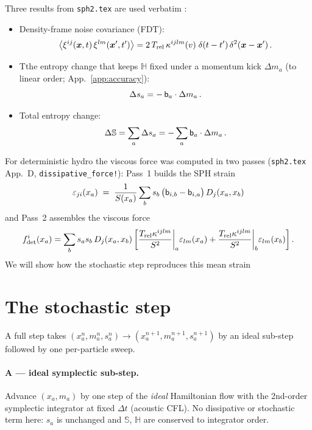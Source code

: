 \documentclass[12pt,aps,preprint,nofootinbib,noshowkeys,noshowpacs,longbibliography,superscriptaddress,tightenlines]{revtex4-2}
\def\Sbb{{\mathbb S}}
\def\bbeta{{\sf b}}
\def\x{{\bm x}}
\def\llangle{\left\langle}
\def\rrangle{\right\rangle}
\def\app#1{App.~\ref{#1}}
\def\st{\begin{equation}}
\def\stp{\end{equation}}
\begin{document}
Three results from \texttt{sph2.tex} are used verbatim :
\begin{itemize}
  \item Density-frame noise covariance (FDT):
        \st
        \label{eq:fdt}
        \llangle \xi^{ij}(\x,t)\,\xi^{lm}(\x',t')\rrangle
          = 2\,T_{\rm rel}\,\kappa^{ijlm}(v)\;\delta(t-t')\,\delta^2(\x-\x')\,.
        \stp
  \item Tthe entropy change that keeps $\mathbb H$ fixed
        under a momentum kick $\Delta m_a$ (to linear order;
        \app{app:accuracy}):
        \st
        \label{eq:ds}
        \Delta s_a = -\,\bbeta_a\cdot\Delta m_a\,.
        \stp
  \item Total entropy change:
        \st
        \label{eq:dS}
        \Delta\Sbb = \sum_a \Delta s_a = -\sum_a \bbeta_a\cdot\Delta m_a\,.
        \stp
\end{itemize}


For deterministic hydro  the viscous force was computed in two passes
(\texttt{sph2.tex} App.~D,    \texttt{dissipative\_force!}): Pass~1 builds the
SPH strain
\st
\label{eq:strain}
\varepsilon_{ji}(x_a) \;=\; \frac{1}{S(x_a)}\sum_b s_b\,
   \big(\bbeta_{i,b}-\bbeta_{i,a}\big)\,D_j(x_a,x_b)
\stp
and Pass~2 assembles the viscous force
\st
\label{eq:twolevel}
f^i_{\rm det}(x_a) = \sum_b s_a s_b\,D_j(x_a,x_b)
    \left[\frac{T_{\rm rel}\kappa^{ijlm}}{S^2}\bigg|_a\varepsilon_{lm}(x_a)
        + \frac{T_{\rm rel}\kappa^{ijlm}}{S^2}\bigg|_b\varepsilon_{lm}(x_b)\right].
\stp
We will show how the stochastic step reproduces this mean strain

\section{The stochastic step}
\label{sec:step}

A full step takes $(x_a^n,m_a^n,s_a^n)\to(x_a^{n+1},m_a^{n+1},s_a^{n+1})$ by
an ideal sub-step followed by one per-particle sweep.

\paragraph{A --- ideal symplectic sub-step.}
Advance $(x_a,m_a)$ by one step of the \emph{ideal} Hamiltonian flow with the
2nd-order symplectic integrator at fixed $\Delta t$ (acoustic CFL).  No
dissipative or stochastic term here: $s_a$ is unchanged and $\Sbb$,
$\mathbb H$ are conserved to integrator order.
\end{document}
